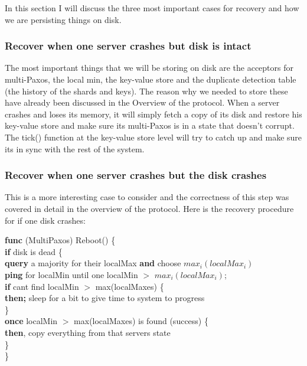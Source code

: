 \documentclass[a4paper]{article}
\begin{document}
In this section I will discuss the three most important cases for recovery and how we are persisting things on disk.

\subsubsection{Recover when one server crashes but disk is intact}
The most important things that we will be storing on disk are the acceptors for multi-Paxos, the local min, the key-value store and the duplicate detection table (the history of the shards and keys).
The reason why we needed to store these have already been discussed in the Overview of the protocol.
When a server crashes and loses its memory, it will simply fetch a copy of its disk and restore his key-value store and make sure its multi-Paxos is in a state that doesn't corrupt.
The tick() function at the key-value store level will try to catch up and make sure its in sync with the rest of the system.

\subsubsection{Recover when one server crashes but the disk crashes}
This is a more interesting case to consider and the correctness of this step was covered in detail in the overview of the protocol.
Here is the recovery procedure for if one disk crashes:
            
\textbf{func} (MultiPaxos) Reboot() \{ \\
\indent \indent \textbf{if} disk is dead \{ \\
\indent \indent \indent \textbf{query} a majority for their  localMax  \textbf{and} choose $max_{i}(localMax_i)$ \\
\indent \indent \indent \textbf{ping} for localMin until one localMin $> $ $max_{i}(localMax_i)$; \\
\indent \indent \indent \textbf{if} cant find localMin $>$ max(localMaxes) \{ \\
\indent \indent \indent \indent \textbf{then;} sleep for a bit to give time to system to progress \\
\indent \indent \indent  \} \\
\indent \indent \indent \textbf{once} localMin $>$ max(localMaxes) is found (success) \{ \\
\indent  \indent \indent \indent \textbf{then}, copy everything from that servers state\\
\indent \indent  \} \\
\indent \}
\end{document}
